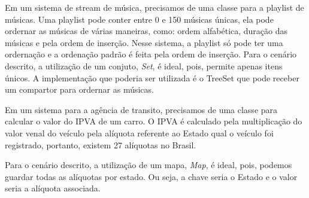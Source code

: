 \documentclass{lib/eng_softdoc}
\begin{document}
\vspace{0.5cm}
\subproblem Em um sistema de stream de música, precisamos de uma classe para a playlist de músicas. Uma playlist pode conter entre 0 e 150 músicas únicas,
ela pode ordernar as músicas de várias maneiras, como: ordem alfabética, duração das músicas e pela ordem de inserção. Nesse
sistema, a playlist só pode ter uma ordernação e a ordenação padrão é feita pela ordem de inserção. \answer Para o cenário
descrito, a utilização de um conjuto, \textit{Set}, é ideal, pois, permite apenas itens únicos. A implementação que poderia ser utilizada é
o TreeSet que pode receber um compartor para ordernar as músicas.

\vspace{0.5cm} 
\subproblem Em um
sistema para a agência de transito, precisamos de uma classe para calcular o valor do IPVA de um carro. O IPVA é calculado pela
multiplicação do valor venal do veículo pela alíquota referente ao Estado qual o veículo foi registrado, portanto, existem 27
alíquotas no Brasil.

\answer Para o cenário descrito, a utilização de um mapa, \textit{Map}, é ideal, pois, podemos guardar todas as alíquotas por estado.
Ou seja, a chave seria o Estado e o valor seria a alíquota associada.
\end{document}
